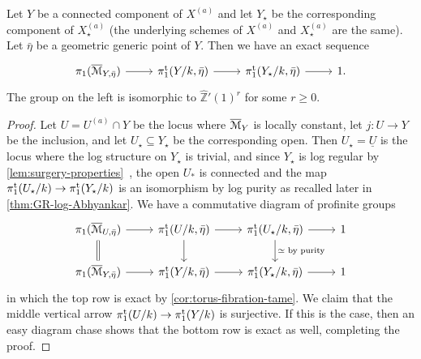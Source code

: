 \begin{lem} \label{lem:right-exact-Xa}
    Let $Y$ be a connected component of $X^{(a)}$ and let $Y_\star$ be the corresponding component of $X^{(a)}_\star$ (the underlying schemes of $X^{(a)}$ and $X^{(a)}_\star$ are the same). Let $\bar\eta$ be a geometric generic point of $Y$. Then we have an exact sequence
    \[
        \begin{tikzcd}
            \pi_1(\overline{\cM}_{Y,\bar\eta}) \ar[r] & \pitame(Y/k,\bar\eta)\ar[r] & \pitame(Y_\star/k,\bar\eta)\ar[r] & 1.
        \end{tikzcd}
    \]
    The group on the left is isomorphic to $\widehat{\mathbb{Z}}'(1)^r$ for some $r\geq 0$. 
\end{lem}

\begin{proof}
Let $U=U^{(a)}\cap Y$ be the locus where $\overline{{\mathcal M}}_Y$ is locally constant, let $j\colon U\to Y$ be the inclusion, and let $U_\star\subseteq Y_\star$ be the corresponding open. Then $U_\star=\underline{U}$ is the locus where the log structure on $Y_\star$ is trivial, and since $Y_\star$ is log regular by \cref{lem:surgery-properties}~, the open $U_\ast$ is connected and the map $\pi_1^{\mathrm{t}}(U_\star/k)\to \pi_1^{\mathrm{t}}(Y_\star/k)$ is an isomorphism by log purity as recalled later in \cref{thm:GR-log-Abhyankar}. We have a commutative diagram of profinite groups
\[
    \begin{tikzcd}
            \pi_1(\overline{\cM}_{U,\bar\eta}) \ar[r] \ar[d,equal] & \pitame(U/k,\bar\eta)\ar[r] \ar[d] & \pitame(U_\star/k,\bar\eta)\ar[r] \ar[d,"\simeq\text{ by purity}"] & 1 \\
            \pi_1(\overline{\cM}_{Y,\bar\eta}) \ar[r] & \pitame(Y/k,\bar\eta)\ar[r] & \pitame(Y_\star/k,\bar\eta)\ar[r] & 1
    \end{tikzcd}
\]
in which the top row is exact by \cref{cor:torus-fibration-tame}. We claim that the middle vertical arrow $\pi_1^{\mathrm{t}}(U/k)\to\pi_1^{\mathrm{t}}(Y/k)$ is surjective. If this is the case, then an easy diagram chase shows that the bottom row is exact as well, completing the proof.


\end{proof}
